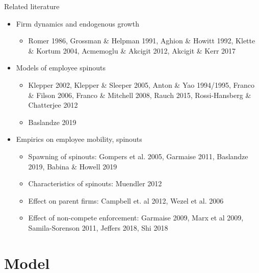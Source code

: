 \documentclass[english,usenames,dvipsnames,handout]{beamer}
\begin{document}
\begin{frame}{Related literature}
\begin{itemize}
\item Firm dynamics and endogenous growth
\begin{itemize}
\item Romer 1986, Grossman \& Helpman 1991, Aghion \& Howitt 1992, Klette \& Kortum 2004, Acmemoglu \& Akcigit 2012, Akcigit \& Kerr 2017
\end{itemize}
\smallskip
\item Models of employee spinouts
\begin{itemize}
\item Klepper 2002, Klepper \& Sleeper 2005, Anton \& Yao 1994/1995, Franco \& Filson 2006, Franco \& Mitchell 2008, Rauch 2015, Rossi-Hansberg \& Chatterjee 2012
\item Baslandze 2019
\end{itemize}
\smallskip
\item Empirics on employee mobility, spinouts
\begin{itemize}
\item Spawning of spinouts: Gompers et al. 2005, Garmaise 2011, Baslandze 2019, Babina \& Howell 2019
\item Characteristics of spinouts: Muendler 2012
\item Effect on parent firms: Campbell et. al 2012, Wezel et al. 2006
\item Effect of non-compete enforcement: Garmaise 2009, Marx et al 2009, Samila-Sorenson 2011, Jeffers 2018, Shi 2018
\end{itemize}
\end{itemize}
\end{frame}

\section{Model}

\begin{frame}
	\tableofcontents[currentsection]
\end{frame}
\end{document}
